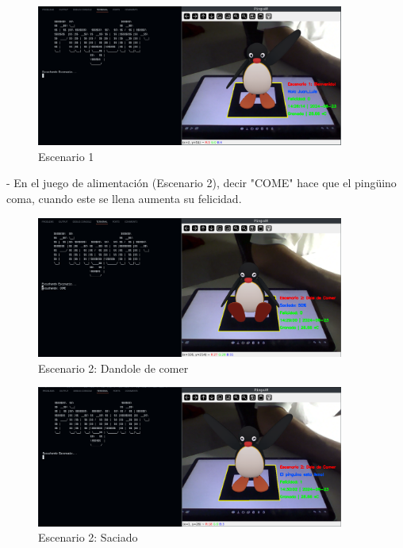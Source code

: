 \documentclass{article}
\begin{document}
\begin{enumerate}
	\begin{figure}[htbp]
		\centering
		\includegraphics[width=0.9\textwidth]{./images/2.png}
		\caption{Escenario 1}
		\label{fig:Escenario 1}
		\end{figure}
    
	\newpage

	\vskip 0.1in
    - En el juego de alimentación (Escenario 2), decir "COME" hace que el pingüino coma, cuando este se llena aumenta su felicidad.
	\vskip 0.1in

	\begin{figure}[htbp]
		\centering
		\includegraphics[width=0.9\textwidth]{./images/4.png}
		\caption{Escenario 2: Dandole de comer}
		\label{fig:Escenario 2}
		\end{figure}
		
	\begin{figure}[htbp]
		\centering
		\includegraphics[width=0.9\textwidth]{./images/5.png}
		\caption{Escenario 2: Saciado}
		\label{fig:Escenario 2.1}
		\end{figure}	
    

\end{enumerate}
\end{document}
